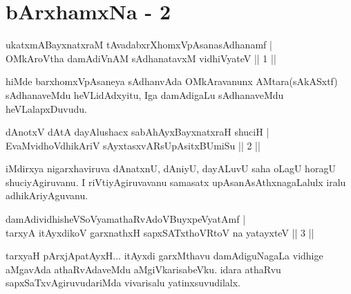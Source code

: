 
\chapter{bArxhamxNa - 2}
\begin{shl}
ukatxmABayxnatxraM tAvadabxrXhomxVpAsanasAdhanamf | \\
OMkAroV\s tha damAdiVnAM sAdhanatavxM vidhiVyateV \hfill||  1 || 
\end{shl}

\begin{artha}
hiMde barxhomxVpAsaneya sAdhanvAda OMkAravanunx AMtara(sAkASxtf) sAdhanaveMdu heVLidAdxyitu, Iga damAdigaLu sAdhanaveMdu heVLalapxDuvudu. 
\end{artha}


\begin{shl}
dAnotxV dAtA dayAlushacx sabAhAyxBayxnatxraH shuciH | \\
EvaMvidhoV\s dhikAriV sAyxtasxvARsUpAsitxBUmiSu \hfill||  2 ||
\end{shl}

\begin{artha}
iMdirxya nigarxhaviruva dAnatxnU, dAniyU, dayALuvU saha oLagU  horagU shuciyAgiruvanu. I riVtiyAgiruvavanu samasatx upAsanAsAthxnagaLalulx iralu adhikAriyAguvanu.
\end{artha}

\begin{shl}
damAdividhisheVSoV\s yamathaRvAdoV\s BuyxpeVyatAmf  | \\
 tarxyA itAyxdikoV garxnathxH sapxSATxthoVR\s toV na yatayxteV \hfill||  3 || 
\end{shl}

\begin{artha}
tarxyaH pArxjApatAyxH... itAyxdi garxMthavu damAdiguNagaLa vidhige aMgavAda athaRvAdaveMdu aMgiVkarisabeVku. idara athaRvu sapxSaTxvAgiruvudariMda vivarisalu yatinxsuvudilalx.
\end{artha}

